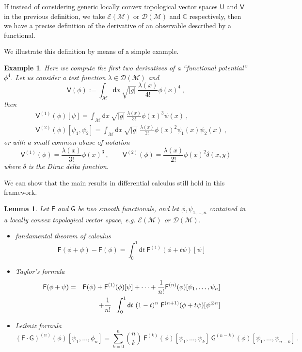 \documentclass[11pt]{book}
\newcommand{\bigint}{\displaystyle\int}
\newcommand{\abs}[1]{\left|#1\right|}
\newcommand{\Dcal}{\mathcal{D}}
\newcommand{\Ecal}{\mathcal{E}}
\newcommand{\Mcal}{\mathcal{M}}
\newcommand{\Cbb}{\mathbb{C}}
\newcommand{\Fsf}{\mathsf{F}}
\newcommand{\Gsf}{\mathsf{G}}
\newcommand{\Usf}{\mathsf{U}}
\newcommand{\Vsf}{\mathsf{V}}
\newcommand{\dsf}{\mathsf{d}}
\theoremstyle{break}
\newtheorem{lemma}{Lemma}[chapter]
\newtheorem{example}{Example}[chapter]
\begin{document}
If instead of considering generic locally convex topological vector spaces $\Usf$ and $\Vsf$ in the previous definition, we take $\Ecal(\Mcal)$ or $\Dcal(\Mcal)$ and $\Cbb$ respectively, then we have a precise definition of the derivative of an observable described by a functional.

\bigskip

We illustrate this definition by means of a simple example. 


\begin{example}
Here we compute the first two derivatives of a ``functional potential'' $\phi^4$. Let us consider a test function $\lambda \in \Dcal(\Mcal)$ and 
%
\begin{equation*}
\Vsf(\phi) := \int_\Mcal \dsf x \ \sqrt{\abs{g}} \ \frac{\lambda(x)}{4!} \phi(x)^4 \ ,
\end{equation*}
%
then
%
\begin{eqnarray*}
&& \Vsf^{(1)}(\phi)[\psi] = \int_\Mcal \dsf x \ \sqrt{\abs{g}} \ \frac{\lambda(x)}{3!} \phi(x)^3  \psi(x)\ , \\
%
&& \Vsf^{(2)}(\phi)[\psi_1,\psi_2] = \int_\Mcal \dsf x  \ \sqrt{\abs{g}} \ \frac{\lambda(x)}{2!} \phi(x)^2 \psi_1(x)\psi_2(x) \ ,
\end{eqnarray*}
%
or with a small common abuse of notation
%
\begin{equation*}
\Vsf^{(1)}(\phi) = \frac{\lambda(x)}{3!} \phi(x)^3 \ , \qquad
%
\Vsf^{(2)}(\phi) = \frac{\lambda(x)}{2!} \phi(x)^2 \delta(x,y)  
\end{equation*}
%
where $\delta$ is the Dirac delta function. 
\end{example}


We can show that the main results in differential calculus still hold in this framework.


\begin{lemma}
%
Let $\Fsf$ and $\Gsf$ be two smooth functionals, and let $\phi , \psi_{1,\dots,n}$ contained in a locally convex topological vector space, e.g. $\Ecal(\Mcal)$ or $\Dcal(\Mcal)$. 
%
\begin{itemize}
%
\item fundamental theorem of calculus
%
\begin{equation*}
\Fsf(\phi + \psi) - \Fsf(\phi) = \int_0^1 \dsf t \ \Fsf^{(1)}(\phi+t\psi)[\psi] 
\end{equation*}
%
\item Taylor's formula
\begin{eqnarray*}
\Fsf(\phi + \psi) &=& \Fsf(\phi) + \Fsf^{(1)}(\phi)[\psi] + \dots + \frac{1}{n!} \Fsf^{(n)}(\phi)[\psi_1,\dots,\psi_n] \\
&& + \cfrac{1}{n!} \ \ \bigint_0^1 \dsf t \ (1-t)^n \ \Fsf^{(n+1)}(\phi+t\psi)[\psi^{\otimes n}]
\end{eqnarray*}
%
\item Leibniz formula
\begin{equation*}
\left(\Fsf \cdot \Gsf\right)^{(n)}(\phi)[\psi_1, \dots ,\phi_n] = \sum_{k=0}^{n} \binom{n}{k} \ \Fsf^{(k)}(\phi)[\psi_1, \dots , \psi_k] \ \Gsf^{(n-k)}(\phi)[\psi_1, \dots , \psi_{n-k}] \ .
\end{equation*}
%
\end{itemize}
%
\end{lemma}
\end{document}
